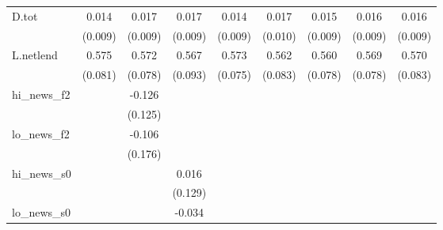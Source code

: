 {\begin{tabular}{l*{8}{c}}
D.tot       &       0.014         &       0.017\sym{*}  &       0.017\sym{*}  &       0.014         &       0.017\sym{*}  &       0.015         &       0.016\sym{*}  &       0.016\sym{*}  \\
            &     (0.009)         &     (0.009)         &     (0.009)         &     (0.009)         &     (0.010)         &     (0.009)         &     (0.009)         &     (0.009)         \\
\addlinespace
L.netlend   &       0.575\sym{***}&       0.572\sym{***}&       0.567\sym{***}&       0.573\sym{***}&       0.562\sym{***}&       0.560\sym{***}&       0.569\sym{***}&       0.570\sym{***}\\
            &     (0.081)         &     (0.078)         &     (0.093)         &     (0.075)         &     (0.083)         &     (0.078)         &     (0.078)         &     (0.083)         \\
\addlinespace
hi\_news\_f2  &                     &      -0.126         &                     &                     &                     &                     &                     &                     \\
            &                     &     (0.125)         &                     &                     &                     &                     &                     &                     \\
\addlinespace
lo\_news\_f2  &                     &      -0.106         &                     &                     &                     &                     &                     &                     \\
            &                     &     (0.176)         &                     &                     &                     &                     &                     &                     \\
\addlinespace
hi\_news\_s0  &                     &                     &       0.016         &                     &                     &                     &                     &                     \\
            &                     &                     &     (0.129)         &                     &                     &                     &                     &                     \\
\addlinespace
lo\_news\_s0  &                     &                     &      -0.034         &                     &                     &                     &                     &                     \\

\end{tabular}}
